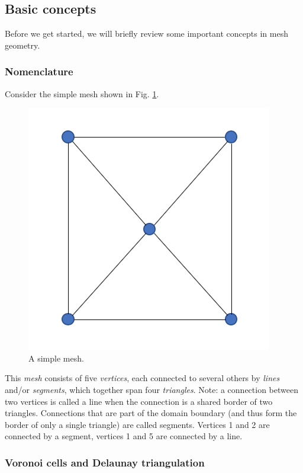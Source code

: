 \documentclass{article}
\begin{document}
\subsection{Basic concepts}

Before we get started, we will briefly review some important concepts in mesh geometry.

\subsubsection{Nomenclature}

Consider the simple mesh shown in Fig. \ref{fig:dummymesh}.

\begin{figure}[h!] \label{fig:dummymesh}
  \includegraphics[width=0.3\linewidth]{Fig_dummymesh_01.png}
  \caption{A simple mesh.}
\end{figure}

This \emph{mesh} consists of five \emph{vertices}, each connected to several others by \emph{lines} and/or \emph{segments}, which together span four \emph{triangles}. Note: a connection between two vertices is called a line when the connection is a shared border of two triangles. Connections that are part of the domain boundary (and thus form the border of only a single triangle) are called segments. Vertices 1 and 2 are connected by a segment, vertices 1 and 5 are connected by a line.

\subsubsection{Voronoi cells and Delaunay triangulation}
\end{document}
